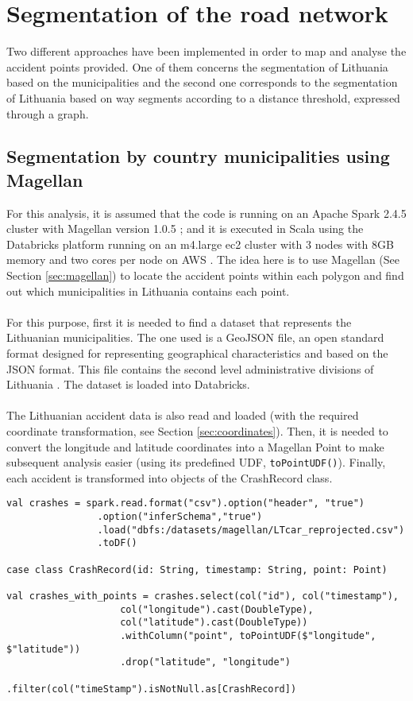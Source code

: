 \section{Segmentation of the road network}\label{sec:segmentation}
Two different approaches have been implemented in order to map and analyse the accident points provided. One of them concerns the segmentation of Lithuania based on the municipalities and the second one corresponds to the segmentation of Lithuania based on way segments according to a distance threshold, expressed through a graph. 
\subsection{Segmentation by country municipalities using Magellan}\label{sec:districts}
For this analysis, it is assumed that the code is running on an Apache Spark 2.4.5 cluster with Magellan version 1.0.5 \cite{magellan1}; and it is executed in Scala using the Databricks platform running on an m4.large ec2 cluster with 3 nodes with 8GB memory and two cores per node on \ac{AWS} \cite{aws}. The idea here is to use Magellan (See Section \ref{sec:magellan}) to locate the accident points within each polygon and find out which municipalities in Lithuania contains each point.
\\
\\
For this purpose, first it is needed to find a dataset that represents the Lithuanian municipalities. The one used is a GeoJSON file, an open standard format designed for representing geographical characteristics and based on the \ac{JSON} format. This file contains the second level administrative divisions of Lithuania \cite{geojson}. The dataset is loaded into Databricks. 
\\
\\
The Lithuanian accident data is also read and loaded (with the required coordinate transformation, see Section \ref{sec:coordinates}). Then, it is needed to convert the longitude and latitude coordinates into a Magellan Point to make subsequent analysis easier (using its predefined \ac{UDF}, \verb+toPointUDF()+). Finally, each accident is transformed into objects of the CrashRecord class.
\\
\begin{lstlisting}[style=myScalastyle]
val crashes = spark.read.format("csv").option("header", "true")
                .option("inferSchema","true")
                .load("dbfs:/datasets/magellan/LTcar_reprojected.csv")
                .toDF()

case class CrashRecord(id: String, timestamp: String, point: Point)

val crashes_with_points = crashes.select(col("id"), col("timestamp"), 
                    col("longitude").cast(DoubleType), 
                    col("latitude").cast(DoubleType))
                    .withColumn("point", toPointUDF($"longitude", $"latitude"))
                    .drop("latitude", "longitude")
                    .filter(col("timeStamp").isNotNull.as[CrashRecord])
\end{lstlisting}


